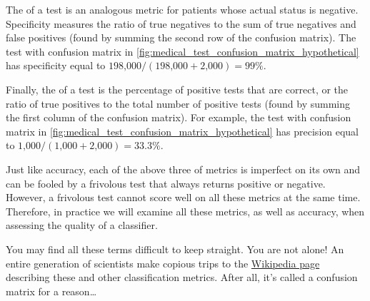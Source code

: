 The  of a test is an analogous metric for patients whose actual status is negative. Specificity measures the ratio of true negatives to the sum of true negatives and false positives (found by summing the second row of the confusion matrix). The test with confusion matrix in \autoref{fig:medical_test_confusion_matrix_hypothetical} has specificity equal to $\text{198,000}/(\text{198,000} + \text{2,000}) = 99\%$.

Finally, the  of a test is the percentage of positive tests that are correct, or the ratio of true positives to the total number of positive tests (found by summing the first column of the confusion matrix). For example, the test with confusion matrix in \autoref{fig:medical_test_confusion_matrix_hypothetical} has precision equal to $\text{1,000}/(\text{1,000} + \text{2,000}) = 33.3\%$.\\

\begin{qbox}\end{qbox}

Just like accuracy, each of the above three of metrics is imperfect on its own and can be fooled by a frivolous test that always returns positive or negative. However, a frivolous test cannot score well on all these metrics at the same time. Therefore, in practice we will examine all these metrics, as well as accuracy, when assessing the quality of a classifier.\\

\begin{qbox}\end{qbox}

You may find all these terms difficult to keep straight. You are not alone! An entire generation of scientists make copious trips to the \href{https://en.wikipedia.org/wiki/Precision_and_recall#Definition_(classification_context)}{Wikipedia page} describing these and other classification metrics. After all, it's called a confusion matrix for a reason\ldots

